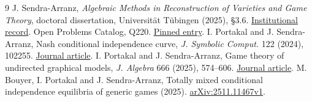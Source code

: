 \documentclass[11pt,a4paper]{amsart}
\begin{document}
\begin{thebibliography}{9}
 J. Sendra-Arranz, \emph{Algebraic Methods in Reconstruction of
Varieties and Game Theory}, doctoral dissertation, Universit\"at T\"ubingen (2025), \S 3.6.
\href{https://publikationen.uni-tuebingen.de/xmlui/handle/10900/160061}{Institutional record}.
 Open Problems Catalog, Q220.
\href{https://github.com/10m-u/open-problems-catalog/blob/ca8d4d44ba3db527f19f28928c240168f545ecfe/problems/game_theory/noncooperative-games-equilibrium-theory.md\#q220}{Pinned entry}.
 I. Portakal and J. Sendra-Arranz, Nash conditional
independence curve, \emph{J. Symbolic Comput.} 122 (2024), 102255.
\href{https://doi.org/10.1016/j.jsc.2023.102255}{Journal article}.
 I. Portakal and J. Sendra-Arranz, Game theory of undirected
graphical models, \emph{J. Algebra} 666 (2025), 574--606.
\href{https://doi.org/10.1016/j.jalgebra.2024.12.004}{Journal article}.
 M. Bouyer, I. Portakal and J. Sendra-Arranz, Totally
mixed conditional independence equilibria of generic games (2025).
\href{https://arxiv.org/abs/2511.11467v1}{arXiv:2511.11467v1}.
\end{thebibliography}
\end{document}
